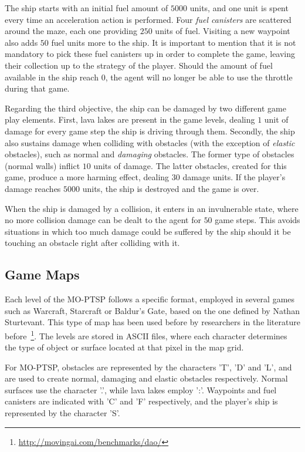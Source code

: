 \documentclass[conference]{IEEEtran}
\begin{document}
The ship starts with an initial fuel amount of $5000$ units, and one unit is spent every time an acceleration action is performed. Four \textit{fuel canisters} are scattered around the maze, each one providing $250$ units of fuel. Visiting a new waypoint also adds $50$ fuel units more to the ship. It is important to mention that it is not mandatory to pick these fuel canisters up in order to complete the game, leaving their collection up to the strategy of the player. Should the amount of fuel available in the ship reach $0$, the agent will no longer be able to use the throttle during that game. 

Regarding the third objective, the ship can be damaged by two different game play elements. First, lava lakes are present in the game levels, dealing $1$ unit of damage for every game step the ship is driving through them. Secondly, the ship also sustains damage when colliding with obstacles (with the exception of \textit{elastic} obstacles), such as normal and \textit{damaging} obstacles. The former type of obstacles (normal walls) inflict $10$ units of damage. The latter obstacles, created for this game, produce a more harming effect, dealing $30$ damage units. If the player's damage reaches $5000$ units, the ship is destroyed and the game is over.

When the ship is damaged by a collision, it enters in an invulnerable state, where no more collision damage can be dealt to the agent for $50$ game steps. This avoids situations in which too much damage could be suffered by the ship should it be touching an obstacle right after colliding with it.

\subsection{Game Maps}

Each level of the MO-PTSP follows a specific format, employed in several games such as Warcraft, Starcraft or Baldur's Gate, based on the one defined by Nathan Sturtevant. This type of map has been used before by researchers in the literature before~\footnote{\url{http://movingai.com/benchmarks/dao/}}. The levels are stored in ASCII files, where each character determines the type of object or surface located at that pixel in the map grid. 

For MO-PTSP, obstacles are represented by the characters 'T', 'D' and 'L', and are used to create normal, damaging and elastic obstacles respectively. Normal surfaces use the character '.', while lava lakes employ ':'. Waypoints and fuel canisters are indicated with 'C' and 'F' respectively, and the player's ship is represented by the character 'S'.
\end{document}
